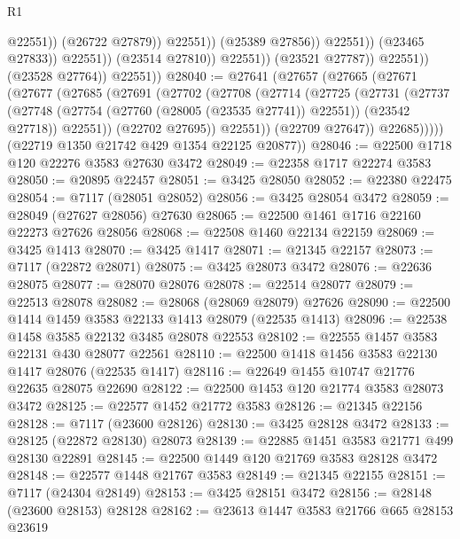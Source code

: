 \begin{lexlean}{R1}
\begin{coremodule}
                                            @22551))
                                        (@26722 @27879))
                                      @22551))
                                  (@25389 @27856))
                                @22551))
                            (@23465 @27833))
                          @22551))
                      (@23514 @27810))
                    @22551))
                (@23521 @27787))
              @22551))
          (@23528 @27764))
        @22551))
@28040 := @27641
    (@27657
      (@27665
        (@27671
          (@27677
            (@27685
              (@27691
                (@27702
                  (@27708
                    (@27714
                      (@27725
                        (@27731
                          (@27737
                            (@27748
                              (@27754 (@27760 (@28005 (@23535 @27741)) @22551))
                              (@23542 @27718))
                            @22551))
                        (@22702 @27695))
                      @22551))
                  (@22709 @27647))
                @22685)))))
      (@22719 @1350 @21742 @429 @1354 @22125 @20877))
@28046 := @22500 @1718 @120 @22276 @3583 @27630 @3472
@28049 := @22358 @1717 @22274 @3583
@28050 := @20895 @22457
@28051 := @3425 @28050
@28052 := @22380 @22475
@28054 := @7117 (@28051 @28052)
@28056 := @3425 @28054 @3472
@28059 := @28049 (@27627 @28056) @27630
@28065 := @22500 @1461 @1716 @22160 @22273 @27626 @28056
@28068 := @22508 @1460 @22134 @22159
@28069 := @3425 @1413
@28070 := @3425 @1417
@28071 := @21345 @22157
@28073 := @7117 (@22872 @28071)
@28075 := @3425 @28073 @3472
@28076 := @22636 @28075
@28077 := @28070 @28076
@28078 := @22514 @28077
@28079 := @22513 @28078
@28082 := @28068 (@28069 @28079) @27626
@28090 := @22500 @1414 @1459 @3583 @22133 @1413 @28079 (@22535 @1413)
@28096 := @22538 @1458 @3585 @22132 @3485 @28078 @22553
@28102 := @22555 @1457 @3583 @22131 @430 @28077 @22561
@28110 := @22500 @1418 @1456 @3583 @22130 @1417 @28076 (@22535 @1417)
@28116 := @22649 @1455 @10747 @21776 @22635 @28075 @22690
@28122 := @22500 @1453 @120 @21774 @3583 @28073 @3472
@28125 := @22577 @1452 @21772 @3583
@28126 := @21345 @22156
@28128 := @7117 (@23600 @28126)
@28130 := @3425 @28128 @3472
@28133 := @28125 (@22872 @28130) @28073
@28139 := @22885 @1451 @3583 @21771 @499 @28130 @22891
@28145 := @22500 @1449 @120 @21769 @3583 @28128 @3472
@28148 := @22577 @1448 @21767 @3583
@28149 := @21345 @22155
@28151 := @7117 (@24304 @28149)
@28153 := @3425 @28151 @3472
@28156 := @28148 (@23600 @28153) @28128
@28162 := @23613 @1447 @3583 @21766 @665 @28153 @23619

\end{coremodule}
\end{lexlean}
